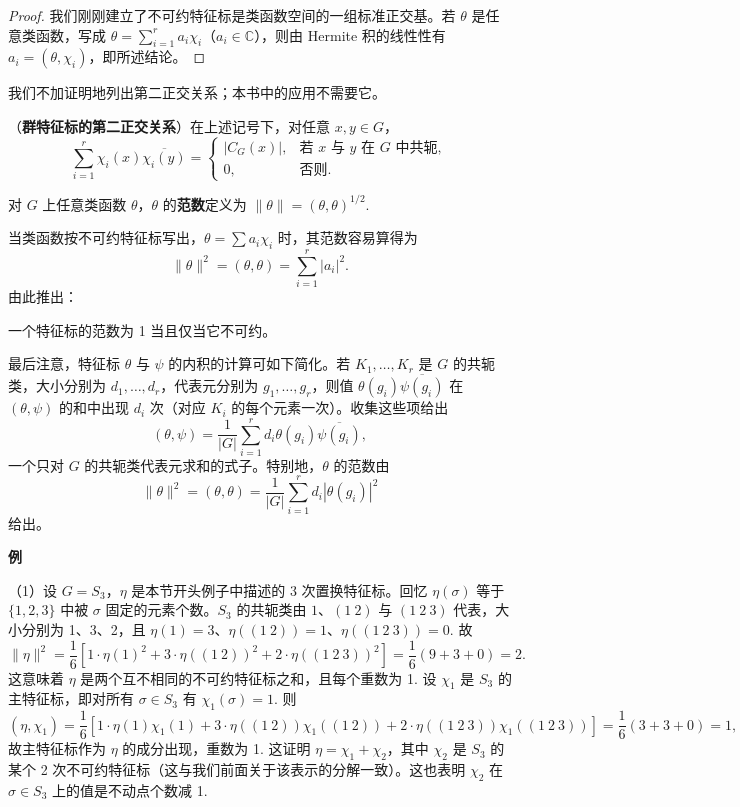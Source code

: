\begin{proof}
我们刚刚建立了不可约特征标是类函数空间的一组标准正交基。若 \(\theta\) 是任意类函数，写成 \(\theta = \sum_{i=1}^{r}a_i\chi_i\)（\(a_i \in \mathbb{C}\)），则由 Hermite 积的线性性有 \(a_i = (\theta, \chi_i)\)，即所述结论。
\end{proof}

我们不加证明地列出第二正交关系；本书中的应用不需要它。

\begin{theorem}\label{thm:18.16}
（\textbf{群特征标的第二正交关系}）在上述记号下，对任意 \(x, y \in G\)，
\[
\sum_{i=1}^{r}\chi_i(x)\overline{\chi_i(y)} = \begin{cases}|C_G(x)|, & \text{若 } x \text{ 与 } y \text{ 在 } G \text{ 中共轭},\\ 0, & \text{否则}.\end{cases}
\]
\end{theorem}

\begin{definition}
对 \(G\) 上任意类函数 \(\theta\)，\(\theta\) 的\textbf{范数}定义为 \(\|\theta\| = (\theta, \theta)^{1/2}\).
\end{definition}

当类函数按不可约特征标写出，\(\theta = \sum a_i\chi_i\) 时，其范数容易算得为
\[
\|\theta\|^2 = (\theta, \theta) = \sum_{i=1}^{r}|a_i|^2.
\]
由此推出：

一个特征标的范数为 1 当且仅当它不可约。

最后注意，特征标 \(\theta\) 与 \(\psi\) 的内积的计算可如下简化。若 \(K_1, \ldots, K_r\) 是 \(G\) 的共轭类，大小分别为 \(d_1, \ldots, d_r\)，代表元分别为 \(g_1, \ldots, g_r\)，则值 \(\theta(g_i)\overline{\psi(g_i)}\) 在 \((\theta, \psi)\) 的和中出现 \(d_i\) 次（对应 \(K_i\) 的每个元素一次）。收集这些项给出
\[
(\theta, \psi) = \frac{1}{|G|}\sum_{i=1}^{r}d_i\theta(g_i)\overline{\psi(g_i)},
\]
一个只对 \(G\) 的共轭类代表元求和的式子。特别地，\(\theta\) 的范数由
\[
\|\theta\|^2 = (\theta, \theta) = \frac{1}{|G|}\sum_{i=1}^{r}d_i|\theta(g_i)|^2
\]
给出。

\noindent\textbf{例}

（1）设 \(G = S_3\)，\(\eta\) 是本节开头例子中描述的 3 次置换特征标。回忆 \(\eta(\sigma)\) 等于 \(\{1,2,3\}\) 中被 \(\sigma\) 固定的元素个数。\(S_3\) 的共轭类由 \(1\)、\((1\ 2)\) 与 \((1\ 2\ 3)\) 代表，大小分别为 1、3、2，且 \(\eta(1) = 3\)、\(\eta((1\ 2)) = 1\)、\(\eta((1\ 2\ 3)) = 0\). 故
\[
\|\eta\|^2 = \frac{1}{6}\left[1\cdot\eta(1)^2+3\cdot\eta((1\ 2))^2+2\cdot\eta((1\ 2\ 3))^2\right] = \frac{1}{6}(9+3+0) = 2.
\]
这意味着 \(\eta\) 是两个互不相同的不可约特征标之和，且每个重数为 1. 设 \(\chi_1\) 是 \(S_3\) 的主特征标，即对所有 \(\sigma \in S_3\) 有 \(\chi_1(\sigma) = 1\). 则
\[
(\eta, \chi_1) = \frac{1}{6}\left[1\cdot\eta(1)\chi_1(1)+3\cdot\eta((1\ 2))\chi_1((1\ 2))+2\cdot\eta((1\ 2\ 3))\chi_1((1\ 2\ 3))\right] = \frac{1}{6}(3+3+0) = 1,
\]
故主特征标作为 \(\eta\) 的成分出现，重数为 1. 这证明 \(\eta = \chi_1+\chi_2\)，其中 \(\chi_2\) 是 \(S_3\) 的某个 2 次不可约特征标（这与我们前面关于该表示的分解一致）。这也表明 \(\chi_2\) 在 \(\sigma \in S_3\) 上的值是不动点个数减 1.

